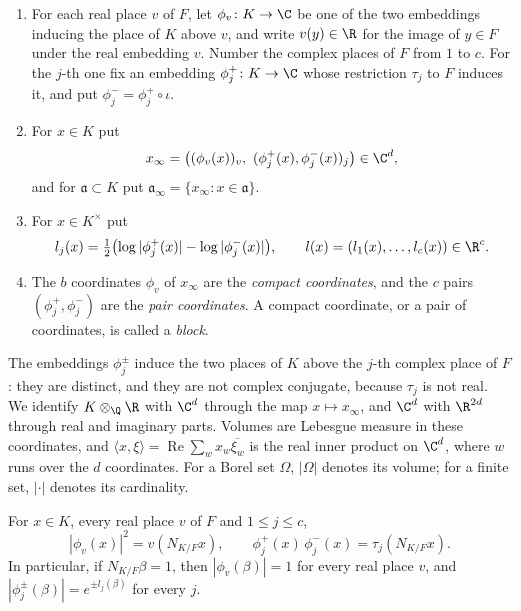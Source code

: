 \begin{definition}\label{geo:coordinates}
\begin{enumerate}
\item[(a)] For each real place $v$ of $F$, let $\phi_v\colon K\to\C$ be one
 of the two embeddings inducing the place of $K$ above $v$, and write
 $v(y)\in\R$ for the image of $y\in F$ under the real embedding $v$. Number
 the complex places of $F$ from $1$ to $c$. For the $j$-th one fix an
 embedding $\phi_j^+\colon K\to\C$ whose restriction $\tau_j$ to $F$ induces
 it, and put $\phi_j^-=\phi_j^+\circ\iota$.
\item[(b)] For $x\in K$ put
 \[
  x_\infty=\bigl((\phi_v(x))_v,\ (\phi_j^+(x),\phi_j^-(x))_{j}\bigr)\in\C^d,
 \]
 and for $\mathfrak a\subset K$ put
 $\mathfrak a_\infty=\{x_\infty:x\in\mathfrak a\}$.
\item[(c)] For $x\in K^\times$ put
 \[
  l_j(x)=\tfrac12\bigl(\log|\phi_j^+(x)|-\log|\phi_j^-(x)|\bigr),
  \qquad l(x)=(l_1(x),\dots,l_c(x))\in\R^c .
 \]
\item[(d)] The $b$ coordinates $\phi_v$ of $x_\infty$ are the \emph{compact
 coordinates}, and the $c$ pairs $(\phi_j^+,\phi_j^-)$ are the \emph{pair
 coordinates}. A compact coordinate, or a pair of coordinates, is called a
 \emph{block}.
\end{enumerate}
\end{definition}

The embeddings $\phi_j^\pm$ induce the two places of $K$ above the $j$-th
complex place of $F$: they are distinct, and they are not complex conjugate,
because $\tau_j$ is not real. We identify $K\otimes_\Q\R$ with $\C^d$ through
the map $x\mapsto x_\infty$, and $\C^d$ with $\R^{2d}$ through real and
imaginary parts. Volumes are Lebesgue measure in these coordinates, and
$\langle x,\xi\rangle=\operatorname{Re}\sum_w x_w\overline{\xi_w}$ is the
real inner product on $\C^d$, where $w$ runs over the $d$ coordinates. For a
Borel set $\Omega$, $|\Omega|$ denotes its volume; for a finite set,
$|\cdot|$ denotes its cardinality.

\begin{lemma}\label{geo:norm-one}
For $x\in K$, every real place $v$ of $F$ and $1\le j\le c$,
\begin{equation}\label{geo:norm-modulus}
 |\phi_v(x)|^2=v(N_{K/F}x),\qquad
 \phi_j^+(x)\,\phi_j^-(x)=\tau_j(N_{K/F}x).
\end{equation}
In particular, if $N_{K/F}\beta=1$, then $|\phi_v(\beta)|=1$ for every real
place $v$, and $|\phi_j^\pm(\beta)|=e^{\pm l_j(\beta)}$ for every $j$.
\end{lemma}

